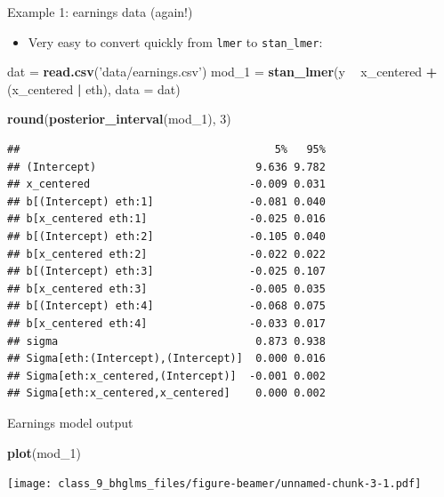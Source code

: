 \documentclass[ignorenonframetext,]{beamer}
\newenvironment{Shaded}{\begin{snugshade}}{\end{snugshade}}
\newcommand{\KeywordTok}[1]{\textcolor[rgb]{0.13,0.29,0.53}{\textbf{#1}}}
\newcommand{\DataTypeTok}[1]{\textcolor[rgb]{0.13,0.29,0.53}{#1}}
\newcommand{\DecValTok}[1]{\textcolor[rgb]{0.00,0.00,0.81}{#1}}
\newcommand{\StringTok}[1]{\textcolor[rgb]{0.31,0.60,0.02}{#1}}
\newcommand{\OperatorTok}[1]{\textcolor[rgb]{0.81,0.36,0.00}{\textbf{#1}}}
\newcommand{\NormalTok}[1]{#1}
\providecommand{\tightlist}{%
  \setlength{\itemsep}{0pt}\setlength{\parskip}{0pt}}
\begin{document}
\begin{frame}[fragile]{Example 1: earnings data (again!)}

\begin{itemize}
\tightlist
\item
  Very easy to convert quickly from \texttt{lmer} to
  \texttt{stan\_lmer}:
\end{itemize}

\tiny

\begin{Shaded}
\begin{Highlighting}[]
\NormalTok{dat =}\StringTok{ }\KeywordTok{read.csv}\NormalTok{(}\StringTok{'data/earnings.csv'}\NormalTok{)}
\NormalTok{mod_}\DecValTok{1}\NormalTok{ =}\StringTok{ }\KeywordTok{stan_lmer}\NormalTok{(y }\OperatorTok{~}\StringTok{ }\NormalTok{x_centered }\OperatorTok{+}\StringTok{ }\NormalTok{(x_centered }\OperatorTok{|}\StringTok{ }\NormalTok{eth), }\DataTypeTok{data =}\NormalTok{ dat)}
\end{Highlighting}
\end{Shaded}

\begin{Shaded}
\begin{Highlighting}[]
\KeywordTok{round}\NormalTok{(}\KeywordTok{posterior_interval}\NormalTok{(mod_}\DecValTok{1}\NormalTok{), }\DecValTok{3}\NormalTok{)}
\end{Highlighting}
\end{Shaded}

\begin{verbatim}
##                                        5%   95%
## (Intercept)                         9.636 9.782
## x_centered                         -0.009 0.031
## b[(Intercept) eth:1]               -0.081 0.040
## b[x_centered eth:1]                -0.025 0.016
## b[(Intercept) eth:2]               -0.105 0.040
## b[x_centered eth:2]                -0.022 0.022
## b[(Intercept) eth:3]               -0.025 0.107
## b[x_centered eth:3]                -0.005 0.035
## b[(Intercept) eth:4]               -0.068 0.075
## b[x_centered eth:4]                -0.033 0.017
## sigma                               0.873 0.938
## Sigma[eth:(Intercept),(Intercept)]  0.000 0.016
## Sigma[eth:x_centered,(Intercept)]  -0.001 0.002
## Sigma[eth:x_centered,x_centered]    0.000 0.002
\end{verbatim}

\end{frame}

\begin{frame}[fragile]{Earnings model output}

\begin{Shaded}
\begin{Highlighting}[]
\KeywordTok{plot}\NormalTok{(mod_}\DecValTok{1}\NormalTok{)}
\end{Highlighting}
\end{Shaded}

\texttt{[image: class\_9\_bhglms\_files/figure-beamer/unnamed-chunk-3-1.pdf]}

\end{frame}
\end{document}
